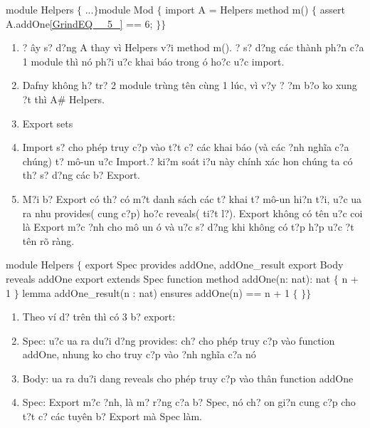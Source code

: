 \documentclass{article} %
\begin{document}
\noindent module Helpers $\{$  ...$\}$module Mod $\{$  import A = Helpers  method m() $\{$    assert A.addOne\eqref{GrindEQ__5_} == 6;  $\}$$\}$

\begin{enumerate}
\item  ? {\dj}\^{a}y s? d?ng A thay v\`{i} Helpers v?i method m(). {\DJ}? s? d?ng c\'{a}c th\`{a}nh ph?n c?a 1 module th\`{i} n\'{o} ph?i {\dj}u?c khai b\'{a}o trong {\dj}\'{o} ho?c {\dj}u?c import.

\item  Dafny kh\^{o}ng h? tr? 2 module tr\`{u}ng t\^{e}n c\`{u}ng 1 l\'{u}c, v\`{i} v?y {\dj}? {\dj}?m b?o ko xung {\dj}?t th\`{i} A\# Helpers.

\item  Export sets

\item  Import s? cho ph\'{e}p truy c?p v\`{a}o t?t c? c\'{a}c khai b\'{a}o (v\`{a} c\'{a}c {\dj}?nh ngh\~{i}a c?a ch\'{u}ng) t? m\^{o}-{\dj}un {\dj}u?c Import.{\DJ}? ki?m so\'{a}t {\dj}i?u n\`{a}y ch\'{i}nh x\'{a}c hon ch\'{u}ng ta c\'{o} th? s? d?ng c\'{a}c b? Export.

\item  M?i b? Export c\'{o} th? c\'{o} m?t danh s\'{a}ch c\'{a}c t? khai t? m\^{o}-{\dj}un hi?n t?i, {\dj}u?c {\dj}ua ra nhu provides( cung c?p) ho?c reveals( ti?t l?). Export kh\^{o}ng c\'{o} t\^{e}n {\dj}u?c coi l\`{a} Export m?c {\dj}?nh cho m\^{o} {\dj}un {\dj}\'{o} v\`{a} {\dj}u?c s? d?ng khi kh\^{o}ng c\'{o} t?p h?p {\dj}u?c {\dj}?t t\^{e}n r\~{o} r\`{a}ng.
\end{enumerate}

\noindent module Helpers $\{$  export Spec provides addOne, addOne\_result  export Body reveals addOne  export extends Spec  function method addOne(n: nat): nat  $\{$    n + 1  $\}$  lemma addOne\_result(n : nat)     ensures addOne(n) == n + 1  $\{$ $\}$$\}$

\begin{enumerate}
\item  Theo v\'{i} d? tr\^{e}n th\`{i} c\'{o} 3 b? export:

\item  Spec: {\dj}u?c {\dj}ua ra du?i d?ng provides: ch? cho ph\'{e}p truy c?p v\`{a}o function addOne, nhung ko cho truy c?p v\`{a}o {\dj}?nh ngh\~{i}a c?a n\'{o}

\item  Body: {\dj}ua ra du?i dang reveals cho ph\'{e}p truy c?p v\`{a}o th\^{a}n function addOne

\item  Spec: Export m?c {\dj}?nh, l\`{a} m? r?ng c?a b? Spec, n\'{o} ch? {\dj}on gi?n cung c?p cho t?t c? c\'{a}c tuy\^{e}n b? Export m\`{a} Spec l\`{a}m.
\end{enumerate}
\end{document}
